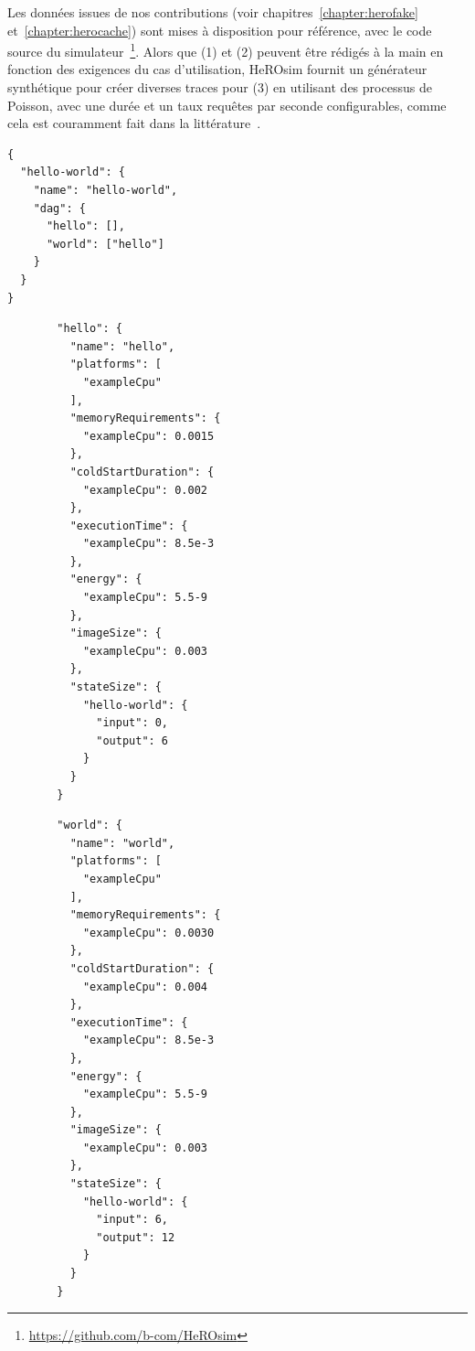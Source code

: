 Les données issues de nos contributions (voir chapitres~\ref{chapter:herofake} et~\ref{chapter:herocache}) sont mises à disposition pour référence, avec le code source du simulateur~\footnote{\href{https://github.com/b-com/HeROsim}{https://github.com/b-com/HeROsim}}. Alors que (1) et (2) peuvent être rédigés à la main en fonction des exigences du cas d'utilisation, HeROsim fournit un générateur synthétique pour créer diverses traces pour (3) en utilisant des processus de Poisson, avec une durée et un taux requêtes par seconde configurables, comme cela est couramment fait dans la littérature~\cite{9928755}.

\begin{longlisting}
    \label{code:herosim-json-application}
    \begin{verbatim}
{
  "hello-world": {
    "name": "hello-world",
    "dag": {
      "hello": [],
      "world": ["hello"]
    }
  }
}
    \end{verbatim}
\end{longlisting}

\begin{figure}[!ht]
    \label{code:herosim-json-functions}
    \begin{minipage}{0.5\textwidth}
        \centering
        \begin{verbatim}
  "hello": {
    "name": "hello",
    "platforms": [
      "exampleCpu"
    ],
    "memoryRequirements": {
      "exampleCpu": 0.0015
    },
    "coldStartDuration": {
      "exampleCpu": 0.002
    },
    "executionTime": {
      "exampleCpu": 8.5e-3
    },
    "energy": {
      "exampleCpu": 5.5-9
    },
    "imageSize": {
      "exampleCpu": 0.003
    },
    "stateSize": {
      "hello-world": {
        "input": 0,
        "output": 6
      }
    }
  }
        \end{verbatim}
    \end{minipage}
    \begin{minipage}{0.5\textwidth}
        \centering
        \begin{verbatim}
  "world": {
    "name": "world",
    "platforms": [
      "exampleCpu"
    ],
    "memoryRequirements": {
      "exampleCpu": 0.0030
    },
    "coldStartDuration": {
      "exampleCpu": 0.004
    },
    "executionTime": {
      "exampleCpu": 8.5e-3
    },
    "energy": {
      "exampleCpu": 5.5-9
    },
    "imageSize": {
      "exampleCpu": 0.003
    },
    "stateSize": {
      "hello-world": {
        "input": 6,
        "output": 12
      }
    }
  }
        \end{verbatim}
    \end{minipage}
\end{figure}

